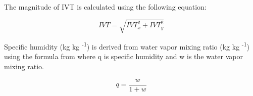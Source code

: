 \documentclass[draft]{agujournal2019}
\begin{document}
The magnitude of IVT is calculated using the following equation:

\begin{equation}
IVT = \sqrt{IVT_{x}^2 + IVT_{y}^2}
\end{equation}

Specific humidity (kg kg \textsuperscript{-1}) is derived from water vapor mixing ratio (kg kg \textsuperscript{-1}) using the formula from \cite{Wallace2006} where q is specific humidity and w is the water vapor mixing ratio.

\begin{equation}
q = \frac{w}{1 + w}
\end{equation}




%


\end{document}
